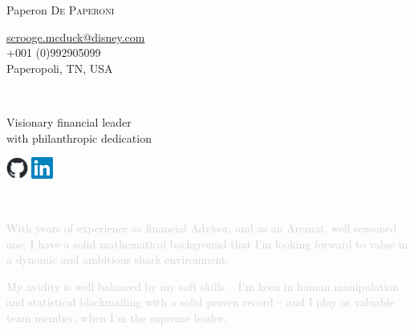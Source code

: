 \documentclass[10pt]{article}
\newcommand{\mail}[1]{\href{mailto:#1}{#1}}
\begin{document}
\thispagestyle{empty}
\begin{minipage}[c][][b]{.6\textwidth}
	{\Huge Paperon  \textsc{De Paperoni}}\\
\end{minipage}
\hfill 
\begin{minipage}[b]{.3\textwidth}
	{\flushright
		\mail{scrooge.mcduck@disney.com} \\
+001 (0)992905099\\
Paperopoli, TN, USA\\
}
\end{minipage}\\


\begin{minipage}[c]{.46\textwidth}
{\large \justifying Visionary financial leader\\with philanthropic dedication}
\end{minipage}
\hfill 
\begin{minipage}[c]{.3\textwidth}
	{\flushright
	    \href{https://thecatapi.com/}{\includegraphics[width=20pt]{./img/github-mark}} 	    \hspace{5pt}
\href{https://thecatapi.com/}{\includegraphics[width=20pt]{./img/In-CMYK-Blue-L}}\\
}
\end{minipage}\vspace{15pt}\\



\begin{minipage}[t]{.47\textwidth}
	\textcolor{lightgray}{With years of experience as financial Advisor, and as an Aromat, well seasoned one, I have a solid mathematical background that I'm looking forward to value in a dynamic and ambitious shark environment. 
	}
\end{minipage}
\hfill
\begin{minipage}[t]{.47\textwidth}
	\textcolor{lightgray}{
		My avidity is well balanced by my soft skills -- I'm keen in human manipulation and statistical blackmailing with a solid proven record -- and I play as valuable team member, when I'm the supreme leader. 
	}
\end{minipage}
\vspace{20pt}
\end{document}
